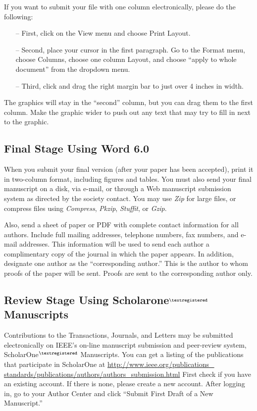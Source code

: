 \documentclass[journal]{IEEEtai}
\begin{document}
If you want to submit your file with one column electronically, please do the following:

\begin{itemize}
\item[--\kern-4pt]First, click on the View menu and choose Print Layout.

\item[--\kern-4pt]Second, place your cursor in the first paragraph. Go to the Format menu, choose Columns, choose one column Layout, and choose ``apply to whole document” from the dropdown menu.

\item[--\kern-4pt]Third, click and drag the right margin bar to just over 4 inches in width.
\end{itemize}

The graphics will stay in the ``second'' column, but you can drag them to the first column. Make the graphic wider to push out any text that may try to fill in next to the graphic.

\subsection{Final Stage Using Word 6.0}

When you submit your final version (after your paper has been accepted), print it in two-column format, including figures and tables. You must also send your final manuscript on a disk, via e-mail, or through a Web manuscript submission system as directed by the society contact. You may use {\it Zip} for large files, or compress files using {\it Compress}, {\it Pkzip}, {\it Stuffit}, or {\it Gzip}. 

Also, send a sheet of paper or PDF with complete contact information for all authors. Include full mailing addresses, telephone numbers, fax numbers, and e-mail addresses. This information will be used to send each author a complimentary copy of the journal in which the paper appears. In addition, designate one author as the ``corresponding author.'' This is the author to whom proofs of the paper will be sent. Proofs are sent to the corresponding author only.

\subsection{Review Stage Using Scholarone$^{\scriptsize\textregistered}$ Manuscripts}

Contributions to the Transactions, Journals, and Letters may be submitted electronically on IEEE's on-line manuscript submission and peer-review system, ScholarOne$^{\scriptsize\textregistered}$ Manuscripts. You can get a listing of the publications that participate in ScholarOne at \underline{http://www.ieee.org/publications\_} \underline{standards/publications/authors/authors\_submission.html} First check if you have an existing account. If there is none, please create a new account. After logging in, go to your Author Center and click ``Submit First Draft of a New Manuscript.'' 
\end{document}
